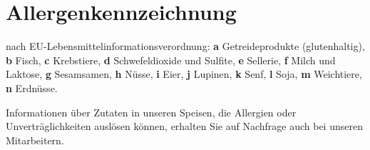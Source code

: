\documentclass[a4paper,10pt,notumble]{leaflet}
\begin{document}

\section*{Allergenkennzeichnung}
nach EU-Lebensmittelinformationsverordnung: 
\textbf{a} Getreideprodukte (glutenhaltig), 
\textbf{b} Fisch,
\textbf{c} Krebstiere,
\textbf{d} Schwefeldioxide und Sulfite,
\textbf{e} Sellerie,
\textbf{f} Milch und Laktose,
\textbf{g} Sesamsamen,
\textbf{h} Nüsse,
\textbf{i} Eier,
\textbf{j} Lupinen,
\textbf{k} Senf,
\textbf{l} Soja,
\textbf{m} Weichtiere,
\textbf{n} Erdnüsse. 

Informationen über Zutaten in unseren Speisen, die Allergien
oder Unverträglichkeiten auslösen können, erhalten Sie auf Nachfrage
auch bei unseren Mitarbeitern.
\end{document}
